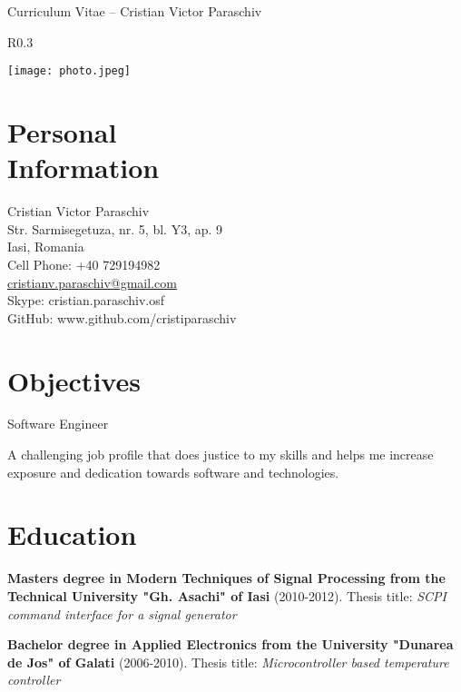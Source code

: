 \documentclass[margin,line,a4paper]{resume}
\begin{document}
{\sc \Large Curriculum Vitae -- Cristian Victor Paraschiv}
\begin{resume}
	\vspace{0.1cm}
	\begin{wrapfigure}{R}{0.3\textwidth}
        \vspace{-1cm}
       \begin{center}
        \texttt{[image: photo.jpeg]}
       \end{center}
        \vspace{-1cm}
    \end{wrapfigure}
\section{\mysidestyle Personal\\Information}%
   	Cristian Victor Paraschiv\\
   	Str. Sarmisegetuza, nr. 5, bl. Y3, ap. 9\\
   	Iasi, Romania\\
   	Cell Phone: +40 729194982\\
   	\href{mailto:cristianv.paraschiv@gmail.com}{cristianv.paraschiv@gmail.com}\\
   	Skype: cristian.paraschiv.osf\\
   	GitHub: www.github.com/cristiparaschiv
   	
\section{\mysidestyle Objectives}%
	Software Engineer
	
	A challenging job profile that does justice to my skills and helps me increase exposure and dedication towards software and technologies.
\section{\mysidestyle Education}
	\textbf{Masters degree in Modern Techniques of Signal Processing from the Technical University "Gh. Asachi" of Iasi} (2010-2012). Thesis title: \textit{SCPI command interface for a signal generator}
	
	\textbf{Bachelor degree in Applied Electronics from the University "Dunarea de Jos" of Galati} (2006-2010). Thesis title: \textit{Microcontroller based temperature controller}
	

\end{resume}
\end{document}

